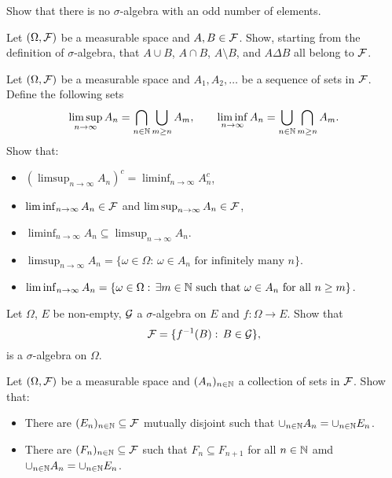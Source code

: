 
\begin{problem}
    Show that there is no $\sigma$-algebra with an odd number of elements.
\end{problem}

\begin{problem}
Let $(\Omega,\mathcal F)$ be a measurable space and $A,B\in \mathcal F$. Show, starting from the definition of $\sigma$-algebra, that $A\cup B$, $A\cap B$, $A\setminus B$, and $A\Delta B$ all belong to $\mathcal F$.
\end{problem}

\begin{problem}
    Let $(\Omega,\mathcal F)$ be a measurable space and $A_1, A_2,\ldots$ be a sequence of sets in $\mathcal F$. Define the following sets
    \begin{equation*}
        \limsup_{n\to\infty} A_n = \bigcap_{n\in \mathbb N} \bigcup_{m\geq n} A_m,\qquad \liminf_{n\to\infty} A_n = \bigcup_{n\in \mathbb N} \bigcap_{m\geq n} A_m.
    \end{equation*}
    Show that:
    \begin{itemize}
        \item $(\limsup_{n\to\infty} A_n)^c = \liminf_{n\to\infty} A_n^c$,
        \item $\liminf_{n\to\infty} A_n \in \mathcal F$ and $\limsup_{n\to\infty} A_n \in \mathcal F$,
        \item $\liminf_{n\to\infty} A_n \subseteq \limsup_{n\to\infty} A_n$.
        \item  $\limsup_{n\to\infty} A_n = \{\omega \in \Omega:\, \omega\in A_n\text{ for infinitely many $n$}\}$.
        \item $\liminf_{n\to\infty} A_n = \{\omega \in \Omega:\, \text{$\exists m\in \mathbb N$ such that $\omega\in A_n$ for all $n\geq m$}\}$.
    \end{itemize}
\end{problem}

\begin{problem}
    Let $\Omega$, $E$ be non-empty, $\mathcal G$ a $\sigma$-algebra on $E$ and $f:\Omega\to E$. Show that 
    \begin{equation*}
        \mathcal F = \{f^{-1}(B):\,B\in \mathcal G\},
    \end{equation*}
    is a $\sigma$-algebra on $\Omega$.
\end{problem}

\begin{problem}
    Let $(\Omega,\mathcal F)$ be a measurable space and $(A_n)_{n\in \mathbb N}$ a collection of sets in $\mathcal F$. Show that:
    \begin{itemize}
        \item There are $(E_n)_{n\in \mathbb N}\subseteq \mathcal F$ mutually disjoint such that $\cup_{n\in \mathbb N} A_n = \cup_{n\in \mathbb N} E_n$.
        \item There are $(F_n)_{n\in \mathbb N}\subseteq \mathcal F$ such that $F_n\subseteq F_{n+1}$ for all $n\in \mathbb N$ amd $\cup_{n\in \mathbb N} A_n = \cup_{n\in \mathbb N} E_n$.
    \end{itemize} 
\end{problem}

